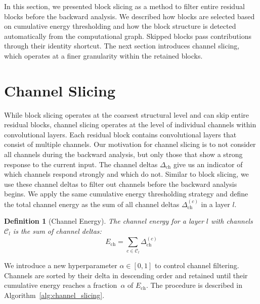 \documentclass[
12pt,
fancyheadings,
a4paper,
twoside,
BCOR=0.7cm,
nobcorignoretitle,
grayscalebody,
]{stsreprt}
\newtheorem{definition}{Definition}[chapter]
\begin{document}
In this section, we presented block slicing as a method to filter entire residual blocks before the
backward analysis.
We described how blocks are selected based on cumulative energy thresholding and how the block
structure is detected automatically from the computational graph. Skipped blocks pass contributions
through their identity shortcut.
The next section introduces channel slicing, which operates at a finer granularity within the
retained blocks.

\section{Channel Slicing}
\label{sec:channel_slicing}

While block slicing operates at the coarsest structural level and can skip entire residual blocks,
channel slicing operates at the level of individual channels within convolutional layers.
Each residual block contains convolutional layers that consist of multiple channels.
Our motivation for channel slicing is to not consider all channels during the backward analysis,
but only those that show a strong response to the current input.
The channel deltas $\Delta_{\text{ch}}$ give us an indicator of which channels respond strongly and
which do not.
Similar to block slicing, we use these channel deltas to filter out channels before the backward
analysis begins.
We apply the same cumulative energy thresholding strategy and define the total channel energy as
the sum of all channel deltas $\Delta_{\text{ch}}^{(c)}$ in a layer $l$.

\begin{definition}[Channel Energy]
The \textit{channel energy} for a layer $l$ with channels $\mathcal{C}_l$ is the sum of channel
deltas:
\begin{equation}
        E_{\text{ch}} = \sum_{c \in \mathcal{C}_l} \Delta_{\text{ch}}^{(c)}
\end{equation}
\end{definition}

We introduce a new hyperparameter $\alpha \in [0, 1]$ to control channel filtering.
Channels are sorted by their delta in descending order and retained until their cumulative energy
reaches a fraction~$\alpha$ of $E_{\text{ch}}$.
The procedure is described in Algorithm~\ref{alg:channel_slicing}.
\end{document}
